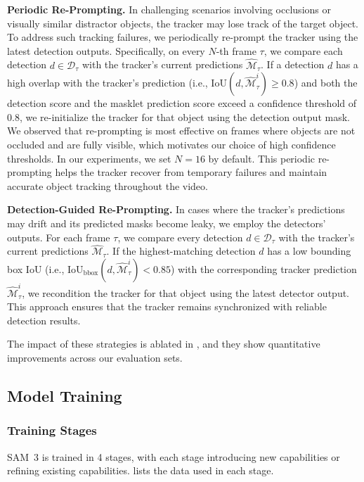 \documentclass[]{fairmeta}
\newcommand{\model}{SAM~3\xspace}
\begin{document}
\textbf{Periodic Re-Prompting.}
In challenging scenarios involving occlusions or visually similar distractor objects, the tracker may lose track of the target object. To address such tracking failures, we periodically re-prompt the tracker using the latest detection outputs. Specifically, on every 
$N$-th frame $\tau$, we compare each detection $d\in \mathcal{D}_\tau$ with the tracker’s current predictions $\mathcal{\hat{M}}_\tau$. If a detection $d$ has a high overlap with the tracker’s prediction (i.e., $\mathrm{IoU}(d, \mathcal{\hat{M}}_\tau^i) \geq 0.8$) and both the detection score and the masklet prediction score exceed a confidence threshold of 0.8, we re-initialize the tracker for that object using the detection output mask. We observed that re-prompting is most effective on frames where objects are not occluded and are fully visible, which motivates our choice of high confidence thresholds. In our experiments, we set $N=16$ by default. This periodic re-prompting helps the tracker recover from temporary failures and maintain accurate object tracking throughout the video.

\textbf{Detection-Guided Re-Prompting.}
In cases where the tracker’s predictions may drift and its predicted masks become leaky, we employ the detectors' outputs. For each frame $\tau$, we compare every detection $d \in \mathcal{D}_\tau$ with the tracker’s current predictions $\mathcal{\hat{M}}_\tau$. If the highest-matching detection $d$ has a low bounding box $\mathrm{IoU}$ (i.e., $\mathrm{IoU}_{\mathrm{bbox}}(d, \mathcal{\hat{M}}_\tau^i) < 0.85$) with the corresponding tracker prediction $\mathcal{\hat{M}}_\tau^i$, we recondition the tracker for that object using the latest detector output. This approach ensures that the tracker remains synchronized with reliable detection results.

The impact of these strategies is ablated in , and they show quantitative improvements across our evaluation sets.


\subsection{Model Training}

\subsubsection{Training Stages}
\label{sec:app_training_stages}

\model is trained in  4 stages, with each stage introducing new capabilities or refining existing capabilities.  lists the data used in each stage.
\end{document}
